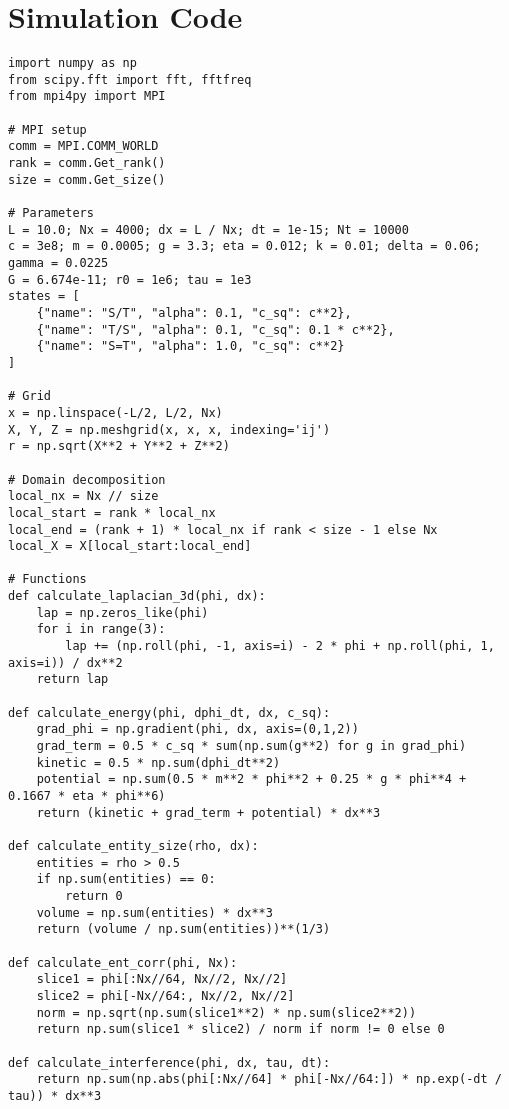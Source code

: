 \documentclass[11pt]{article}
\begin{document}
\section{Simulation Code}
\lstset{language=Python, basicstyle=\footnotesize\ttfamily, breaklines=true, numbers=left}
\begin{lstlisting}
import numpy as np
from scipy.fft import fft, fftfreq
from mpi4py import MPI

# MPI setup
comm = MPI.COMM_WORLD
rank = comm.Get_rank()
size = comm.Get_size()

# Parameters
L = 10.0; Nx = 4000; dx = L / Nx; dt = 1e-15; Nt = 10000
c = 3e8; m = 0.0005; g = 3.3; eta = 0.012; k = 0.01; delta = 0.06; gamma = 0.0225
G = 6.674e-11; r0 = 1e6; tau = 1e3
states = [
    {"name": "S/T", "alpha": 0.1, "c_sq": c**2},
    {"name": "T/S", "alpha": 0.1, "c_sq": 0.1 * c**2},
    {"name": "S=T", "alpha": 1.0, "c_sq": c**2}
]

# Grid
x = np.linspace(-L/2, L/2, Nx)
X, Y, Z = np.meshgrid(x, x, x, indexing='ij')
r = np.sqrt(X**2 + Y**2 + Z**2)

# Domain decomposition
local_nx = Nx // size
local_start = rank * local_nx
local_end = (rank + 1) * local_nx if rank < size - 1 else Nx
local_X = X[local_start:local_end]

# Functions
def calculate_laplacian_3d(phi, dx):
    lap = np.zeros_like(phi)
    for i in range(3):
        lap += (np.roll(phi, -1, axis=i) - 2 * phi + np.roll(phi, 1, axis=i)) / dx**2
    return lap

def calculate_energy(phi, dphi_dt, dx, c_sq):
    grad_phi = np.gradient(phi, dx, axis=(0,1,2))
    grad_term = 0.5 * c_sq * sum(np.sum(g**2) for g in grad_phi)
    kinetic = 0.5 * np.sum(dphi_dt**2)
    potential = np.sum(0.5 * m**2 * phi**2 + 0.25 * g * phi**4 + 0.1667 * eta * phi**6)
    return (kinetic + grad_term + potential) * dx**3

def calculate_entity_size(rho, dx):
    entities = rho > 0.5
    if np.sum(entities) == 0:
        return 0
    volume = np.sum(entities) * dx**3
    return (volume / np.sum(entities))**(1/3)

def calculate_ent_corr(phi, Nx):
    slice1 = phi[:Nx//64, Nx//2, Nx//2]
    slice2 = phi[-Nx//64:, Nx//2, Nx//2]
    norm = np.sqrt(np.sum(slice1**2) * np.sum(slice2**2))
    return np.sum(slice1 * slice2) / norm if norm != 0 else 0

def calculate_interference(phi, dx, tau, dt):
    return np.sum(np.abs(phi[:Nx//64] * phi[-Nx//64:]) * np.exp(-dt / tau)) * dx**3


\end{lstlisting}
\end{document}
